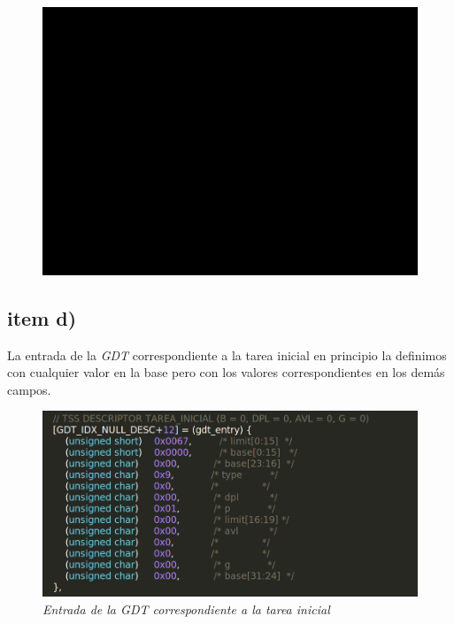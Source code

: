 \begin{figure}[H]
\begin{center}
\includegraphics[width=\linewidth]{ejercicio6/tss_perro.png}
\caption{{\small }}
\endminipage
\end{center}
\end{figure}


\subsection{item d)}

La entrada de la \textit{GDT} correspondiente a la tarea inicial en principio la definimos con cualquier valor  en la base pero con los valores correspondientes en los demás campos.

\begin{figure}[H]
\begin{center}
\includegraphics[width=\linewidth]{ejercicio6/gdt_tarea_inicial.png}
\caption{{\small \textit{Entrada de la \textit{GDT} correspondiente a la tarea inicial }}}
\endminipage
\end{center}
\end{figure}


